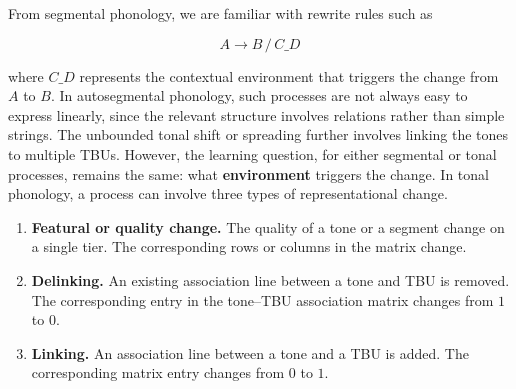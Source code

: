 From segmental phonology, we are familiar with rewrite rules such as

\[
A \rightarrow B \,/\, C \_ D
\]

where \(C \_ D\) represents the contextual environment that triggers the
change from \(A\) to \(B\). In autosegmental phonology, such processes
are not always easy to express linearly, since the relevant structure
involves relations rather than simple strings. The unbounded tonal shift
or spreading further involves linking the tones to multiple TBUs.
However, the learning question, for either segmental or tonal processes,
remains the same: what \textbf{environment} triggers the change. In
tonal phonology, a process can involve three types of representational
change.

\begin{enumerate}
	\item \textbf{Featural or quality change.} The quality of a tone or a
	segment change on a single tier. The corresponding rows or columns
	in the matrix change.
	
	\item \textbf{Delinking.} An existing association line between a tone
	and TBU is removed. The corresponding entry in the tone--TBU
	association matrix changes from \(1\) to \(0\).
	
	\item \textbf{Linking.} An association line between a tone and a TBU
	is added. The corresponding matrix entry changes from \(0\) to
	\(1\).
\end{enumerate}
%

